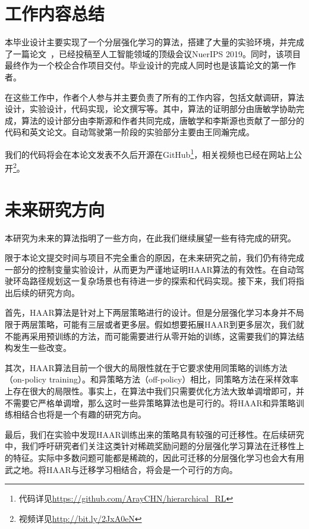 \section{工作内容总结}
本毕业设计主要实现了一个分层强化学习的算法，搭建了大量的实验环境，并完成了一篇论文~\cite{HAAR}，已经投稿至人工智能领域的顶级会议NuerIPS 2019。同时，该项目最终作为一个校企合作项目交付。毕业设计的完成人同时也是该篇论文的第一作者。

在这些工作中，作者个人参与并主要负责了所有的工作内容，包括文献调研，算法设计，实验设计，代码实现，论文撰写等。其中，算法的证明部分由唐敏学协助完成，算法的设计部分由李斯源和作者共同完成，唐敏学和李斯源也贡献了一部分的代码和英文论文。自动驾驶第一阶段的实验部分主要由王同瀚完成。

我们的代码将会在本论文发表不久后开源在GitHub\footnote{代码详见\url{https://github.com/ArayCHN/hierarchical_RL}}，相关视频也已经在网站上公开\footnote{视频详见\url{http://bit.ly/2JxA0eN}}。

\section{未来研究方向}
本研究为未来的算法指明了一些方向，在此我们继续展望一些有待完成的研究。

限于本论文提交时间与项目不完全重合的原因，在未来研究之前，我们仍有待完成一部分的控制变量实验设计，从而更为严谨地证明HAAR算法的有效性。在自动驾驶环岛路径规划这一复杂场景也有待进一步的探索和代码实现。接下来，我们将指出后续的研究方向。

首先，HAAR算法是针对上下两层策略进行的设计。但是分层强化学习本身并不局限于两层策略，可能有三层或者更多层。假如想要拓展HAAR到更多层次，我们就不能再采用预训练的方法，而可能需要进行从零开始的训练，这需要我们的算法结构发生一些改变。

其次，HAAR算法目前一个很大的局限性就在于它要求使用同策略的训练方法（on-policy training）。和异策略方法（off-policy）相比，同策略方法在采样效率上存在很大的局限性。事实上，在算法中我们只需要优化方法大致单调增即可，并不需要它严格单调增，那么这时一些异策略算法也是可行的。将HAAR和异策略训练相结合也将是一个有趣的研究方向。

最后，我们在实验中发现HAAR训练出来的策略具有较强的可迁移性。在后续研究中，我们呼吁研究者们关注这类针对稀疏奖励问题的分层强化学习算法在迁移性上的特征。实际中多数问题可能都是稀疏的，因此可迁移的分层强化学习也会大有用武之地。将HAAR与迁移学习相结合，将会是一个可行的方向。
